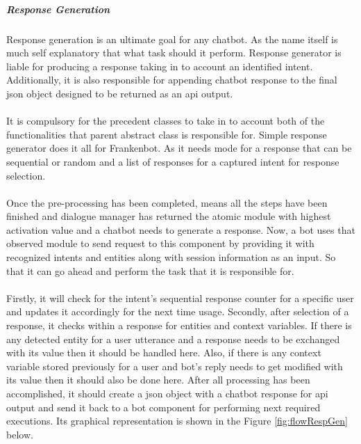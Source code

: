 \subparagraph*{Response Generation}
Response generation is an ultimate goal for any chatbot. As the name itself is much self explanatory that what task should it perform. Response generator is liable for producing a response taking in to account an identified intent. Additionally, it is also responsible for appending chatbot response to the final json object designed to be returned as an api output. 
\\~\\
It is compulsory for the precedent classes to take in to account both of the functionalities that parent abstract class is responsible for. Simple response generator does it all for Frankenbot. As it needs mode for a response that can be sequential or random and a list of responses for a captured intent for response selection.
\\~\\
Once the pre-processing has been completed, means all the steps have been finished and dialogue manager has returned the atomic module with highest activation value and a chatbot needs to generate a response. Now, a bot uses that observed module to send request to this component by providing it with recognized intents and entities along with session information as an input. So that it can go ahead and perform the task that it is responsible for. 
\\~\\
Firstly, it will check for the intent's sequential response counter for a specific user and updates it accordingly for the next time usage. Secondly, after selection of a response, it checks within a response for entities and context variables. If there is any detected entity for a user utterance and a response needs to be exchanged with its value then it should be handled here. Also, if there is any context variable stored previously for a user and bot's reply needs to get modified with its value then it should also be done here. After all processing has been accomplished, it should create a json object with a chatbot response for api output and send it back to a bot component for performing next required executions. Its graphical representation is shown in the Figure \ref{fig:flowRespGen} below. 

